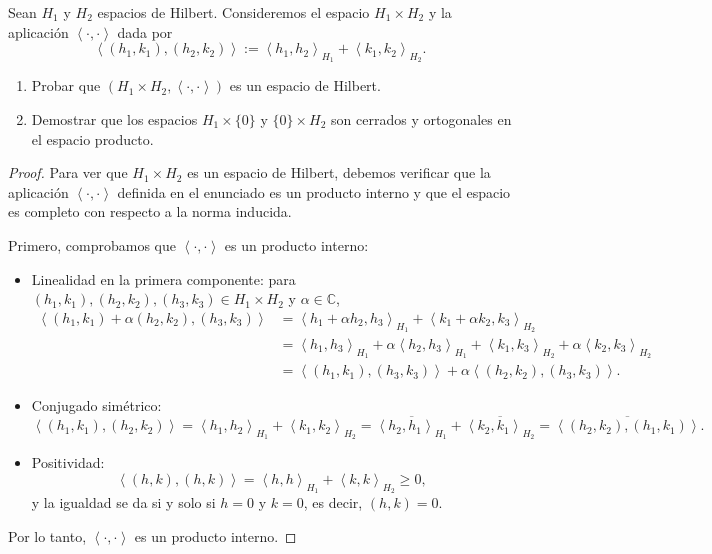 \documentclass{article}
\theoremstyle{definition}
\newcommand{\ip}[2]{\left\langle #1, #2 \right\rangle}   %
\newenvironment{ejercicio}[1]{\begin{trivlist}
\item[\hskip \labelsep {\bfseries Ejercicio}\hskip \labelsep {\bfseries #1.}]}{\end{trivlist}}
\begin{document}
\vspace{0.5cm}

\begin{ejercicio}{6}
	Sean \( H_1 \) y \( H_2 \) espacios de Hilbert. Consideremos el espacio \( H_1 \times H_2 \) y la aplicación \( \ip{\cdot}{\cdot} \) dada por
	\[ \ip{(h_1, k_1)}{(h_2, k_2)} := \ip{h_1}{h_2}_{H_1} + \ip{k_1}{k_2}_{H_2}. \]
	\begin{enumerate}
		\item Probar que \( (H_1 \times H_2, \ip{\cdot}{\cdot}) \) es un espacio de Hilbert.
		\item Demostrar que los espacios \( H_1 \times \{0\} \) y \( \{0\} \times H_2 \) son cerrados y ortogonales en el espacio producto.
	\end{enumerate}
\end{ejercicio}
\begin{proof}
	Para ver que \( H_1 \times H_2 \) es un espacio de Hilbert, debemos verificar que la aplicación \( \ip{\cdot}{\cdot} \) definida en el enunciado es un producto interno y que el espacio es completo con respecto a la norma inducida.

	Primero, comprobamos que \( \ip{\cdot}{\cdot} \) es un producto interno:
	\begin{itemize}
		\item Linealidad en la primera componente: para \( (h_1, k_1), (h_2, k_2), (h_3, k_3) \in H_1 \times H_2 \) y \( \alpha \in \mathbb{C} \),
		      \begin{align*}
			      \ip{(h_1, k_1) + \alpha (h_2, k_2)}{(h_3, k_3)} & = \ip{h_1 + \alpha h_2}{h_3}_{H_1} + \ip{k_1 + \alpha k_2}{k_3}_{H_2}                                 \\
			                                                      & = \ip{h_1}{h_3}_{H_1} + \alpha \ip{h_2}{h_3}_{H_1} + \ip{k_1}{k_3}_{H_2} + \alpha \ip{k_2}{k_3}_{H_2} \\ & = \ip{(h_1, k_1)}{(h_3, k_3)} + \alpha \ip{(h_2, k_2)}{(h_3, k_3)}.
		      \end{align*}
		\item Conjugado simétrico:
		      \[
			      \ip{(h_1, k_1)}{(h_2, k_2)} = \ip{h_1}{h_2}_{H_1} + \ip{k_1}{k_2}_{H_2} = \overline{\ip{h_2}{h_1}_{H_1}} + \overline{\ip{k_2}{k_1}_{H_2}} = \overline{\ip{(h_2, k_2)}{(h_1, k_1)}}.
		      \]
		\item Positividad:
		      \[
			      \ip{(h, k)}{(h, k)} = \ip{h}{h}_{H_1} + \ip{k}{k}_{H_2} \ge 0,
		      \]
		      y la igualdad se da si y solo si \( h = 0 \) y \( k = 0 \), es decir, \( (h, k) = 0 \).
	\end{itemize}
	Por lo tanto, \( \ip{\cdot}{\cdot} \) es un producto interno.


\end{proof}
\end{document}
